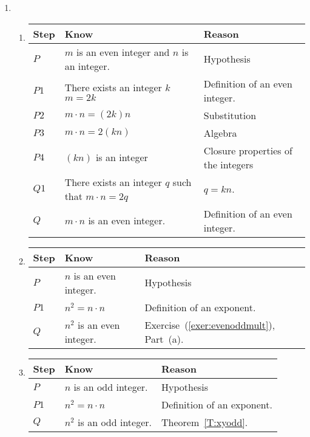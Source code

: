 \begin{enumerate}
\item \begin{enumerate}  \item
\begin{tabular}[t]{|p{0.4in}|p{1.6in}|p{1.6in}|}
  \hline
  \textbf{Step}  &  \textbf{Know}  &  \textbf{Reason} \\ \hline
  $P$  &  $m$ is an even integer and $n$ is an integer.  &  Hypothesis \\ \hline
  $P1$ &  There exists an integer $k$ $m = 2k$    &  Definition of an even integer. \\ \hline
  $P2$  &  $m \cdot n = \left( 2k \right) n$  &  Substitution \\ \hline
  $P3$  &  $m \cdot n = 2 \left( {kn} \right)$  &  Algebra  \\ \hline
  $P4$  &  $\left( {kn} \right)$ is an integer  &  Closure properties of the integers \\ \hline
  $Q1$  &  There exists an integer $q$ such that $m \cdot n = 2q$  & $q = kn$.  \\ \hline
  $Q$  &  $m \cdot n$ is an even integer. &  Definition of an even integer. \\ \hline
\end{tabular}

\item \begin{tabular}[t]{|p{0.4in}|p{1.6in}|p{1.6in}|}
  \hline
  \textbf{Step}  &  \textbf{Know}  &  \textbf{Reason} \\ \hline
  $P$  &  $n$ is an even integer.  &  Hypothesis \\ \hline
  $P1$ &  $n^2 = n \cdot n$        &  Definition of an exponent. \\ \hline
  $Q$  &  $n^2$ is an even integer. &  Exercise~(\ref{exer:evenoddmult}), Part~(a). \\ \hline
\end{tabular}

\item \begin{tabular}[t]{|p{0.4in}|p{1.6in}|p{1.6in}|}
  \hline
  \textbf{Step}  &  \textbf{Know}  &  \textbf{Reason} \\ \hline
  $P$  &  $n$ is an odd integer.  &  Hypothesis \\ \hline
  $P1$ &  $n^2 = n \cdot n$        &  Definition of an exponent. \\ \hline
  $Q$  &  $n^2$ is an odd integer. &  Theorem~\ref{T:xyodd}. \\ \hline
\end{tabular}
\end{enumerate}
\end{enumerate}


